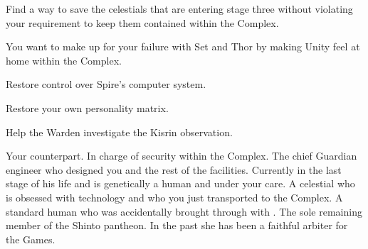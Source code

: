\documentclass[char]{guardians}
\begin{document}
\begin{itemz}
  \item Find a way to save the celestials that are entering stage three without violating your requirement to keep them contained within the Complex.
  \item You want to make up for your failure with Set and Thor by making Unity feel at home within the Complex.
  \item Restore control over Spire's computer system.
  \item Restore your own personality matrix.
  \item Help the Warden investigate the Kisrin observation.
\end{itemz}


\begin{contacts}
  \contact{\cWarden{}} Your counterpart. In charge of security within the Complex.
  \contact{\cJascha{}} The chief Guardian engineer who designed you and the rest of the facilities. Currently in the last stage of his life and is genetically a human and under your care.
  \contact{\cUnity{}} A celestial who is obsessed with technology and who you just transported to the Complex.
  \contact{\cKachiko{}} A standard human who was accidentally brought through with \cUnity{}.
  \contact{\cAmaterasu{}} The sole remaining member of the Shinto pantheon. In the past she has been a faithful arbiter for the Games.
\end{contacts}
\end{document}
